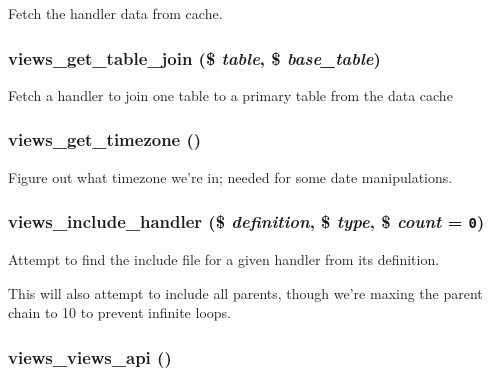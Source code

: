 Fetch the handler data from cache. \hypertarget{handlers_8inc_76ba5af63134db1102702696a50ba6f5}{
\subsubsection[{views\_\-get\_\-table\_\-join}]{\setlength{\rightskip}{0pt plus 5cm}views\_\-get\_\-table\_\-join (\$ {\em table}, \/  \$ {\em base\_\-table})}}
\label{handlers_8inc_76ba5af63134db1102702696a50ba6f5}


Fetch a handler to join one table to a primary table from the data cache \hypertarget{handlers_8inc_3bd8b0bf769dc6d068349b222edb410c}{
\subsubsection[{views\_\-get\_\-timezone}]{\setlength{\rightskip}{0pt plus 5cm}views\_\-get\_\-timezone ()}}
\label{handlers_8inc_3bd8b0bf769dc6d068349b222edb410c}


Figure out what timezone we're in; needed for some date manipulations. \hypertarget{handlers_8inc_275561b03251609d3a86de094f4cac9a}{
\subsubsection[{views\_\-include\_\-handler}]{\setlength{\rightskip}{0pt plus 5cm}views\_\-include\_\-handler (\$ {\em definition}, \/  \$ {\em type}, \/  \$ {\em count} = {\tt 0})}}
\label{handlers_8inc_275561b03251609d3a86de094f4cac9a}


Attempt to find the include file for a given handler from its definition.

This will also attempt to include all parents, though we're maxing the parent chain to 10 to prevent infinite loops. \hypertarget{handlers_8inc_907c76d0314986d60f7e2361243eaa5d}{
\subsubsection[{views\_\-views\_\-api}]{\setlength{\rightskip}{0pt plus 5cm}views\_\-views\_\-api ()}}
\label{handlers_8inc_907c76d0314986d60f7e2361243eaa5d}



